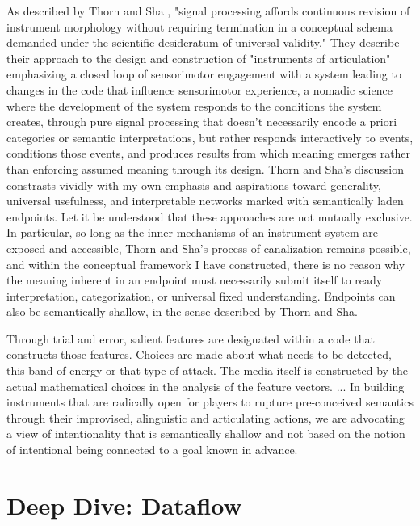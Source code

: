 \documentclass[main.tex]{subfiles}
\begin{document}
As described by Thorn and Sha \cite{thorn2019moco_instruments-of-articulation},
"signal processing affords continuous revision of instrument 
morphology without requiring termination in a conceptual schema 
demanded under the scientific desideratum of universal validity." They describe their approach
to the design and construction of "instruments of articulation" emphasizing a closed loop
of sensorimotor engagement with a system leading to changes in the code that influence
sensorimotor experience, a nomadic science where the development of the system responds to the
conditions the system creates, through pure signal processing that doesn't necessarily
encode a priori categories or semantic interpretations, but rather responds interactively to
events, conditions those events, and produces results from which meaning emerges rather than
enforcing assumed meaning through its design. Thorn and Sha's discussion constrasts
vividly with my own emphasis and aspirations toward generality, universal usefulness, and
interpretable networks marked with semantically laden endpoints. Let it be understood that
these approaches are not mutually exclusive. In particular, so long as the inner mechanisms
of an instrument system are exposed and accessible, Thorn and Sha's process of canalization
remains possible, and within the conceptual framework I have constructed, there is no
reason why the meaning inherent in an endpoint must necessarily submit itself to ready
interpretation, categorization, or universal fixed understanding. Endpoints can also
be semantically shallow, in the sense described by Thorn and Sha.

\begin{displayquote}
Through trial and 
error, salient features are designated within a code that constructs 
those features. Choices are made about what needs to be detected, 
this band of energy or that type of attack. The media itself is 
constructed by the actual mathematical choices in the analysis of 
the feature vectors. ... In building instruments that are radically open 
for players to rupture pre-conceived semantics through their 
improvised, alinguistic and articulating actions, we are advocating 
a view of intentionality that is semantically shallow and not based 
on the notion of intentional being connected to a goal known in 
advance.
\end{displayquote}

\section{Deep Dive: Dataflow}
\end{document}
